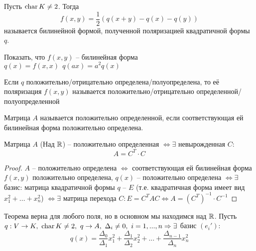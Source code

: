 \begin{Def} 
	Пусть $\operatorname{char} K \neq 2$. Тогда
	\[f(x,y) = \frac{1}{2} (q(x+y) - q(x) - q(y))\] 
	называется билинейной формой, полученной поляризацией квадратичной формы $q$.
\end{Def} 

\begin{Ex}
	Показать, что $f(x, y)$ -- билинейная форма\\
	$q(x) = f(x,x) \ \ q(ax) = a^2 q(x)$
\end{Ex}

\begin{Def} 
	Если $q$ положительно/отрицательно определена/полуопределена, то её поляризация $f(x, y)$ называется положительно/отрицательно определенной/полуопределенной 
\end{Def} 

\begin{Def}
	Матрица $A$ называется положительно определенной, если соответствующая ей билинейная форма положительно определена. 
\end{Def}

\begin{Thm} 
	Матрица $A$ (Над $\mathbb{R}$) -- положительно определенная $\Leftrightarrow \exists$ невырожденная $C:$ 
	\[A = C^T \cdot C\]
\end{Thm} 

\begin{proof}
	$A$ -- положительно определена $\Leftrightarrow$ соответствующая ей билинейная форма $f(x,y)$ положительно определена,  $q(x)$ -- положительно определена
	$\Leftrightarrow \exists$ базис: матрица квадратичной формы $q$ -- $E$ (т.е. квадратичная форма имеет вид $x^2_1 + ... + x^2_n$) $\Leftrightarrow \exists$ матрица перехода $C: E = C^TAC \Leftrightarrow A = (C^T)^{-1} \cdot C^{-1}$ 
\end{proof}

\begin{Thm} 
	Теорема верна для любого поля, но в основном мы находимся над $\mathbb{R}$.
	Пусть $q: V \to K, \ \operatorname{char} K \neq 2, \ q \to A, \ \Delta_i \neq 0, \ i = 1, ..., n  \Rightarrow \exists$ базис $(e_i'):$
	\[q(x) = \frac{\Delta_0}{\Delta_1} x_1^2 + \frac{\Delta_1}{\Delta_2} x_2^2 + ... + \frac{\Delta_{n-1}}{\Delta_n} x^2_n\]
\end{Thm} 

